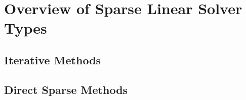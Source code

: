 
\chapter{Overview of Sparse Linear Solver Types}\label{subseq:overview-of-linear-solver-types}

\section{Iterative Methods}


\section{Direct Sparse Methods}



